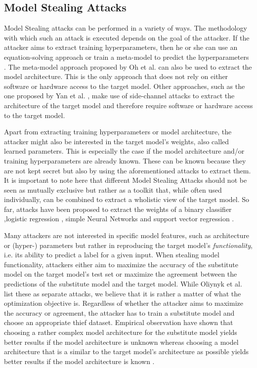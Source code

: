 \subsection{Model Stealing Attacks}
\label{sec:ModelStealing:Attacks}
Model Stealing attacks can be performed in a variety of ways. The methodology with which such an attack is executed depends on the goal of the attacker. If the attacker
aims to extract training hyperparameters, then he or she can use an equation-solving approach \cite{wang2018stealing} or train a meta-model to predict the hyperparameters
\cite{oh2019towards}. The meta-model approach proposed by Oh et al. can also be used to extract the model architecture. This is the only approach that does not rely on either
software or hardware access to the target model. Other approaches, such as the one proposed by Yan et al. \cite{yan2020cache}, make use of side-channel attacks to extract
the architecture of the target model and therefore require software or hardware access to the target model. \par
Apart from extracting training hyperparameters or model architecture, the attacker might also be interested in the target model's weights, also called learned parameters. This
is especially the case if the model architecture and/or training hyperparameters are already known. These can be known because they are not kept secret but also by using the 
aforementioned attacks to extract them. It is important to note here that different Model Stealing Attacks should not be seen as mutually exclusive but rather as a toolkit that,
while often used individually, can be combined to extract a wholistic view of the target model. So far, attacks have been proposed to extract the weights of a binary classifier
\cite{lowd2005adversarial},logistic regression \cite{tramer2016stealing}, simple Neural Networks \cite{tramer2016stealing} and support vector regression \cite{reith2019efficiently}. \par
Many attackers are not interested in specific model features, such as architecture or (hyper-) parameters but rather in reproducing the target model's \textit{functionality}, i.e.
its ability to predict a label for a given input. When stealing model functionality, attackers either aim to maximize the accuracy of the substitute model on the target model's
test set or maximize the agreement between the predictions of the substitute model and the target model. While Oliynyk et al. list these as separate attacks, we believe that it is
rather a matter of what the optimization objective is. Regardless of whether the attacker aims to maximize the accuracy or agreement, the attacker has to train a substitute model
and choose an appropriate thief dataset. Empirical observation have shown that choosing a rather complex model architecture for the substitute model yields better results if the
model architecture is unknown whereas choosing a model architecture that is a similar to the target model's architecture as possible yields better results if the model architecture
is known \cite{orekondy2019knockoff} \cite{pal2020activethief}. \par

